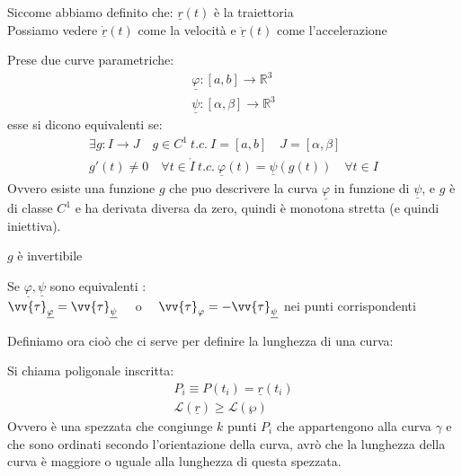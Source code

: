 \documentclass[a4paper, oneside]{article}
\begin{document}
\begin{observation}
    Siccome abbiamo definito che: $\underline{r}(t)$ è la traiettoria\\
    Possiamo vedere $\underline{\dot{r}}(t)$ come la velocità e $\underline{\ddot{r}}(t)$ come l'accelerazione
\end{observation}



\begin{definition}
    Prese due curve parametriche:
    \begin{gather*}
        \underline{\varphi}:[a,b] \to \mathbb{R}^3\\ 
        \underline{\psi}: [\alpha,\beta] \to \mathbb{R}^3 
    \end{gather*}
    esse si dicono equivalenti se:
    \begin{gather*}
        \exists g : I \to J \quad g \in C^1 \ t.c. \ I = [a,b] \quad J = [\alpha,\beta]\\
        g'(t) \neq 0 \quad \forall t \in \mathring{I} \ t.c. \ \underline{\varphi}(t) = \underline{\psi}(g(t)) \quad \forall t \in I
    \end{gather*}
    Ovvero esiste una funzione $g$ che puo descrivere la curva $\underline{\varphi}$ in funzione di $\underline{\psi}$, e $g$ è di classe $C^1$ e ha derivata diversa da zero, quindi è monotona stretta (e quindi iniettiva).
    \begin{observation}
        $g$ è invertibile
    \end{observation}
    \begin{observation}
        Se $\underline{\varphi}, \underline{\psi}$ sono equivalenti :\\
        $\vv{\tau}_{\underline{\varphi}} = \vv{\tau}_{\underline{\psi}}\quad$ o $\quad\vv{\tau}_\varphi = - \vv{\tau}_{\underline{\psi}}$ nei punti corrispondenti\\
    \end{observation}
\end{definition}

\noindent
Definiamo ora cioò che ci serve per definire la lunghezza di una curva:
\begin{center}
\end{center}\begin{definition}
    Si chiama poligonale inscritta:
    \begin{gather*}
        P_i \equiv P(t_i) = \underline{r}(t_i)\\
        \mathcal{L}(\underline{r}) \geq \mathcal{L}(\wp)
    \end{gather*}
    Ovvero è una spezzata che congiunge $k$ punti $P_i$ che appartengono alla curva $\gamma$ e che sono ordinati secondo l'orientazione della curva, avrò che la lunghezza della curva è maggiore o uguale alla lunghezza di questa spezzata.
\end{definition}
\end{document}
